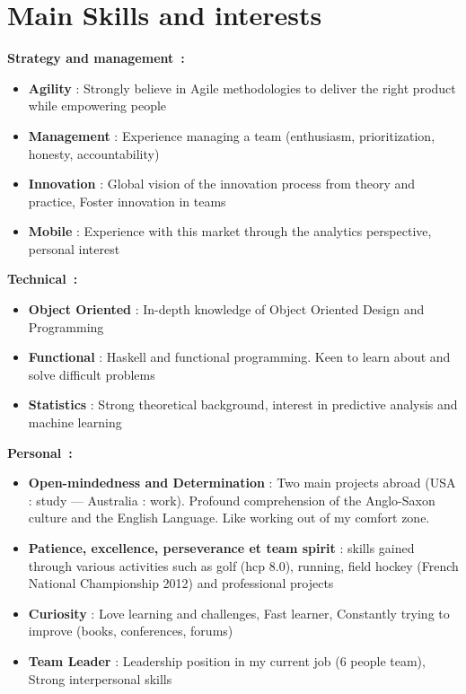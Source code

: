 \documentclass[]{friggeri-cv} %
\begin{document}
\section{Main Skills and interests}


\textbf{\large Strategy and management~:} 
\vspace{-2mm}
\begin{itemize}[noitemsep,nolistsep]
\item \textbf{Agility} : Strongly believe in Agile methodologies to deliver the right product while empowering people
\item \textbf{Management} : Experience managing a team (enthusiasm, prioritization, honesty, accountability)
\item \textbf{Innovation} : Global vision of the innovation process from theory and practice, Foster innovation in teams
\item \textbf{Mobile} : Experience with this market through the analytics perspective, personal interest
\end{itemize}


\textbf{\large Technical~:} 
\vspace{-2mm}
\begin{itemize}[noitemsep,nolistsep]
\item \textbf{Object Oriented} : In-depth knowledge of Object Oriented Design and Programming
\item \textbf{Functional} : Haskell and functional programming. Keen to learn about and solve difficult problems
\item \textbf{Statistics} : Strong theoretical background, interest in predictive analysis and machine learning
\end{itemize}


\textbf{\large Personal~:} 
\vspace{-2mm}
\begin{itemize}[noitemsep,nolistsep]
\item \textbf{Open-mindedness and Determination} : Two main projects abroad (USA : study --- Australia : work). Profound comprehension of the Anglo-Saxon culture and the English Language. Like working out of my comfort zone.
\item \textbf{Patience, excellence, perseverance et team spirit} : skills gained through various activities such as golf (hcp 8.0), running, field hockey (French National Championship 2012) and professional projects
\item \textbf{Curiosity} : Love learning and challenges, Fast learner, Constantly trying to improve (books, conferences, forums)
\item \textbf{Team Leader} : Leadership position in my current job (6 people team), Strong interpersonal skills
\end{itemize}
\end{document}
